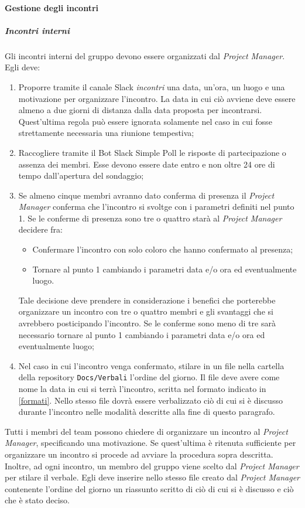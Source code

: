 		\paragraph{Gestione degli incontri}
			\subparagraph{Incontri interni} \Spazio
			 Gli incontri interni del gruppo devono essere organizzati dal \emph{Project Manager}. Egli deve:
			\begin{enumerate}
				\item Proporre tramite il canale Slack \emph{incontri} una data, un'ora, un luogo e una motivazione per organizzare l'incontro. La data in cui ciò avviene deve essere almeno a due giorni di distanza dalla data proposta per incontrarsi. Quest'ultima regola può essere ignorata solamente nel caso in cui fosse strettamente necessaria una riunione tempestiva;
				
				\item Raccogliere tramite il Bot Slack Simple Poll le risposte di partecipazione o assenza dei membri. Esse devono essere date entro e non oltre 24 ore di tempo dall'apertura del sondaggio;
				
				\item Se almeno cinque membri avranno dato conferma di presenza il \emph{Project Manager} conferma che l'incontro si svoltge con i parametri definiti nel punto 1. 
				Se le conferme di presenza sono tre o quattro starà al \emph{Project Manager} decidere fra: 
				\begin{itemize}
					\item Confermare l'incontro con solo coloro che hanno confermato al presenza;
					\item Tornare al punto 1 cambiando i parametri data e/o ora ed eventualmente luogo.
				\end{itemize}
				Tale decisione deve prendere in considerazione i benefici che porterebbe organizzare un incontro con tre o quattro membri e gli svantaggi che si avrebbero posticipando l'incontro.
				Se le conferme sono meno di tre sarà necessario tornare al punto 1 cambiando i parametri data e/o ora ed eventualmente luogo;
				
				\item Nel caso in cui l'incontro venga confermato, stilare in un file nella cartella della repository \texttt{Docs/Verbali} l'ordine del giorno. Il file deve avere come nome la data in cui si terrà l'incontro, scritta nel formato indicato in \ref{formati}. Nello stesso file dovrà essere verbalizzato ciò di cui si è discusso durante l'incontro nelle modalità descritte alla fine di questo paragrafo.
			\end{enumerate}
			Tutti i membri del team possono chiedere di organizzare un incontro al \emph{Project Manager}, specificando una motivazione. Se quest'ultima è ritenuta sufficiente per organizzare un incontro si procede ad avviare la procedura sopra descritta. 
			\\Inoltre, ad ogni incontro, un membro del gruppo viene scelto dal \emph{Project Manager} per stilare il verbale. Egli deve inserire nello stesso file creato dal \emph{Project Manager} contenente l'ordine del giorno un riassunto scritto di ciò di cui si è discusso e ciò che è stato deciso.
			
